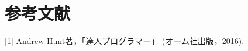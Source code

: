 \chapter{参考文献}\label{ux53c2ux8003ux6587ux732e}

    {[}1{]} Andrew Hunt著，「達人プログラマー」 (オーム社出版，2016).

    